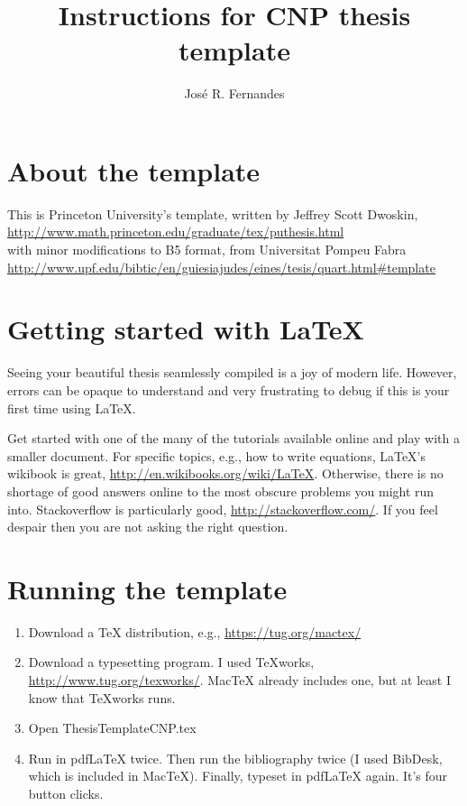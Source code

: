 \documentclass[11pt]{article} %
\title{Instructions for CNP thesis template}
\author{Jos\'{e} R. Fernandes}
\begin{document}
\maketitle

\section{About the template}

This is Princeton University's template, written by Jeffrey Scott Dwoskin,\\ 
\url{http://www.math.princeton.edu/graduate/tex/puthesis.html}\\
with minor modifications to B5 format, from Universitat Pompeu Fabra\\
 \url{http://www.upf.edu/bibtic/en/guiesiajudes/eines/tesis/quart.html\#template}\\

\section{Getting started with LaTeX}

Seeing your beautiful thesis seamlessly compiled is a joy of modern life. However, errors can be opaque to understand and very frustrating to debug if this is your first time using LaTeX.

Get started with one of the many of the tutorials available online and play with a smaller document. For specific topics, e.g., how to write equations, LaTeX's wikibook is great, \url{http://en.wikibooks.org/wiki/LaTeX}. Otherwise, there is no shortage of good answers online to the most obscure problems you might run into. Stackoverflow is particularly good, \url{http://stackoverflow.com/}. If you feel despair then you are not asking the right question. 

\section{Running the template}

\begin{enumerate}
\item{Download a TeX distribution, e.g., \url{https://tug.org/mactex/}}
\item{Download a typesetting program. I used TeXworks, \url{http://www.tug.org/texworks/}. MacTeX already includes one, but at least I know that TeXworks runs.}
\item{Open ThesisTemplateCNP.tex}
\item{Run in pdfLaTeX twice. Then run the bibliography twice (I used BibDesk, which is included in MacTeX). Finally, typeset in pdfLaTeX again. It's four button clicks.}
\end{enumerate}
\end{document}
